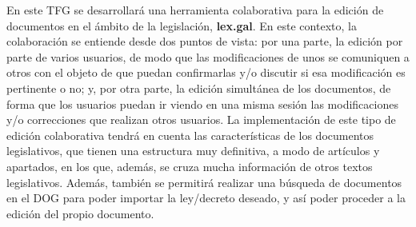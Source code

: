 En este TFG se desarrollará una herramienta colaborativa para la edición de documentos en el ámbito de la legislación, {\bf lex.gal}. En este contexto, la colaboración se entiende desde dos puntos de vista: por una parte, la edición por parte de varios usuarios, de modo que las modificaciones de unos se comuniquen a otros con el objeto de que puedan confirmarlas y/o discutir si esa modificación es pertinente o no; y, por otra parte, la edición simultánea de los documentos, de forma que los usuarios puedan ir viendo en una misma sesión las modificaciones y/o correcciones que realizan otros usuarios. La implementación de este tipo de edición colaborativa tendrá en cuenta las características de los documentos legislativos, que tienen una estructura muy definitiva, a modo de artículos y apartados, en los que, además, se cruza mucha información de otros textos legislativos. Además, también se permitirá realizar una búsqueda de documentos en el DOG para poder importar la ley/decreto deseado, y así poder proceder a la edición del propio documento.